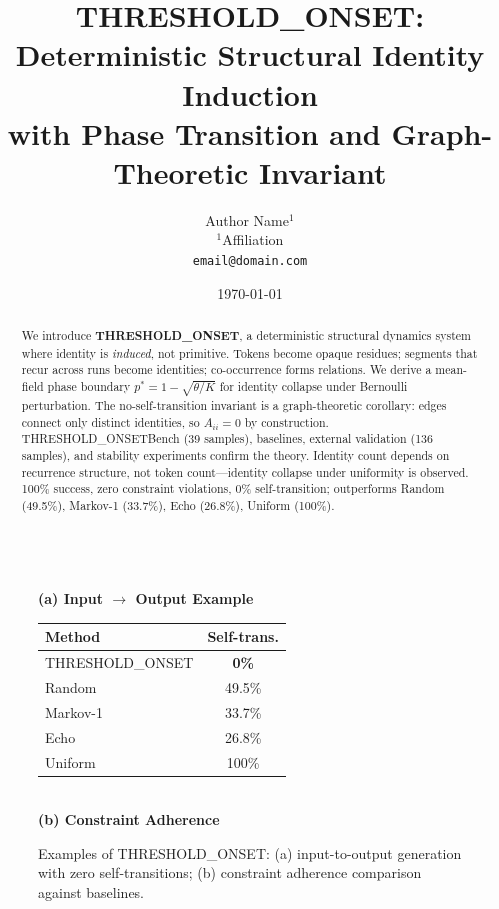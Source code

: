\documentclass[10pt]{article}
\title{THRESHOLD\_ONSET: Deterministic Structural Identity Induction\\
with Phase Transition and Graph-Theoretic Invariant}
\author{
  Author Name$^{1}$ \\
  $^{1}$Affiliation \\
  \texttt{email@domain.com}
}
\date{\today}
\begin{document}
\maketitle

\begin{abstract}
We introduce \textbf{THRESHOLD\_ONSET}, a deterministic structural dynamics system where identity is \emph{induced}, not primitive. Tokens become opaque residues; segments that recur across runs become identities; co-occurrence forms relations. We derive a mean-field phase boundary $p^* = 1 - \sqrt{\theta/K}$ for identity collapse under Bernoulli perturbation. The no-self-transition invariant is a graph-theoretic corollary: edges connect only distinct identities, so $A_{ii} = 0$ by construction. THRESHOLD\_ONSETBench (39 samples), baselines, external validation (136 samples), and stability experiments confirm the theory. Identity count depends on recurrence structure, not token count—identity collapse under uniformity is observed. 100\% success, zero constraint violations, 0\% self-transition; outperforms Random (49.5\%), Markov-1 (33.7\%), Echo (26.8\%), Uniform (100\%).
\end{abstract}

\begin{figure}[t]
\centering
\begin{minipage}{0.48\textwidth}
\centering
{}
\vspace{0.3cm}\\
\textbf{(a) Input $\rightarrow$ Output Example}
\end{minipage}
\hfill
\begin{minipage}{0.48\textwidth}
\centering
\begin{tabular}{lc}
\toprule
\textbf{Method} & \textbf{Self-trans.} \\
\midrule
THRESHOLD\_ONSET & \textbf{0\%} \\
Random & 49.5\% \\
Markov-1 & 33.7\% \\
Echo & 26.8\% \\
Uniform & 100\% \\
\bottomrule
\end{tabular}
\vspace{0.3cm}\\
\textbf{(b) Constraint Adherence}
\end{minipage}
\caption{Examples of THRESHOLD\_ONSET: (a) input-to-output generation with zero self-transitions; (b) constraint adherence comparison against baselines.}
\label{fig:teaser}
\end{figure}
\end{document}
